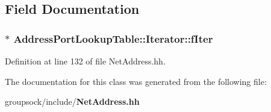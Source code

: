 \subsection{Field Documentation}
\subsubsection[{f\+Iter}]{$\ast$ Address\+Port\+Lookup\+Table\+::\+Iterator\+::f\+Iter\hspace{0.3cm}{\ttfamily [private]}}\label{classAddressPortLookupTable_1_1Iterator_a8fd9d40665448c3aa884c831db41c8e3}


Definition at line 132 of file Net\+Address.\+hh.



The documentation for this class was generated from the following file\+:\begin{DoxyCompactItemize}
\item 
groupsock/include/{\bf Net\+Address.\+hh}\end{DoxyCompactItemize}
